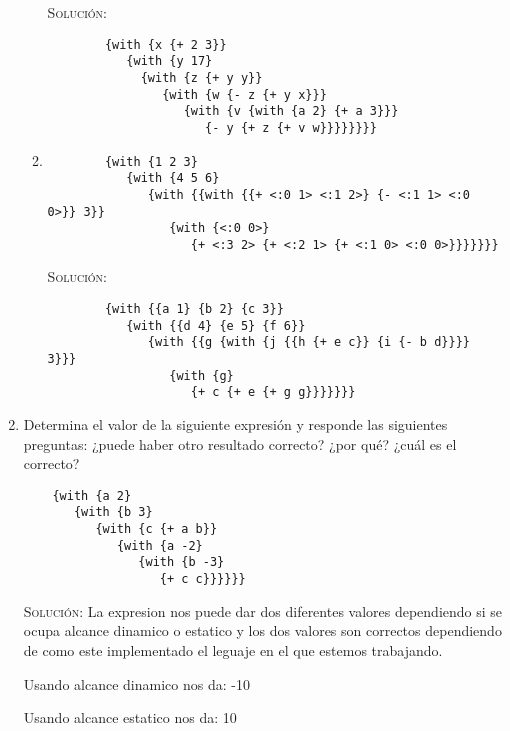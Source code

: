 \documentclass[letterpaper,11pt]{article}
\begin{document}
\begin{enumerate}
\begin{enumerate}
        \textsc{Solución:}
        \begin{verbatim}
        {with {x {+ 2 3}} 
           {with {y 17} 
             {with {z {+ y y}} 
                {with {w {- z {+ y x}}} 
                   {with {v {with {a 2} {+ a 3}}} 
                      {- y {+ z {+ v w}}}}}}}}
        \end{verbatim}

        \item 
        \begin{verbatim}
        {with {1 2 3} 
           {with {4 5 6} 
              {with {{with {{+ <:0 1> <:1 2>} {- <:1 1> <:0 0>}} 3}} 
              	 {with {<:0 0>}
                 	{+ <:3 2> {+ <:2 1> {+ <:1 0> <:0 0>}}}}}}}
        \end{verbatim}

        \textsc{Solución:}
        \begin{verbatim}
        {with {{a 1} {b 2} {c 3}} 
           {with {{d 4} {e 5} {f 6}} 
              {with {{g {with {j {{h {+ e c}} {i {- b d}}}} 3}}}
              	 {with {g}
                 	{+ c {+ e {+ g g}}}}}}}
        \end{verbatim}
    \end{enumerate}

    \item Determina el valor de la siguiente expresión y responde las siguientes 
    preguntas: ¿puede haber otro resultado correcto? ¿por qué? ¿cuál es el 
    correcto? 
    \begin{verbatim}
    {with {a 2} 
       {with {b 3} 
          {with {c {+ a b}} 
             {with {a -2} 
                {with {b -3} 
                   {+ c c}}}}}}
    \end{verbatim}

    \textsc{Solución:} La expresion nos puede dar dos diferentes valores dependiendo si se ocupa alcance dinamico 	o estatico y los dos valores son correctos dependiendo de como este implementado el leguaje en el que 				estemos trabajando.
    
    Usando alcance dinamico nos da: -10
    
    Usando alcance estatico nos da:  10
\end{enumerate}
\end{document}
